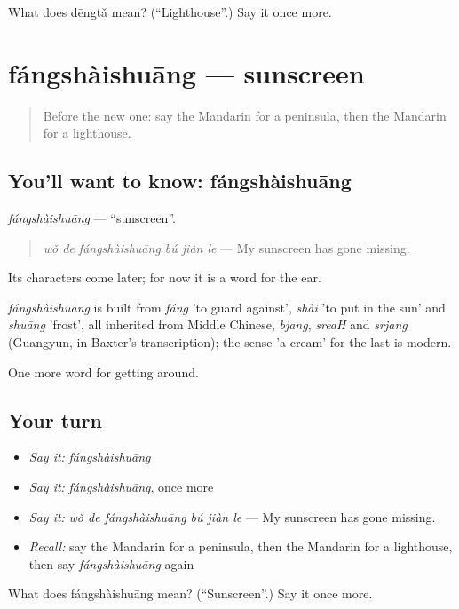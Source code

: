 \begin{tcolorbox}[breakable,colback=teal!4,colframe=teal!35!black,title={Before you move on}]
What does dēngtǎ mean? (\textquotedblleft{}Lighthouse\textquotedblright{}.) Say it once more.
\end{tcolorbox}
\section[fángshàishuāng]{fángshàishuāng — sunscreen}

\label{lesson:ZH-C444-fangshaishuang}



\begin{quote}
Before the new one: say the Mandarin for a peninsula, then the Mandarin for a lighthouse.
\end{quote}

\subsection*{You'll want to know: fángshàishuāng}
\emph{fángshàishuāng} — \textquotedblleft{}sunscreen\textquotedblright{}.

\begin{quote}
\emph{wǒ de fángshàishuāng bú jiàn le} — My sunscreen has gone missing.
\end{quote}

Its characters come later; for now it is a word for the ear.

\begin{cousinweb}
\emph{fángshàishuāng} is built from \emph{fáng} 'to guard against', \emph{shài} 'to put in the sun' and \emph{shuāng} 'frost', all inherited from Middle Chinese, \emph{bjang}, \emph{sreaH} and \emph{srjang} (Guangyun, in Baxter's transcription); the sense 'a cream' for the last is modern.
\end{cousinweb}

\begin{grammarlens}[title={What you've built}]
One more word for getting around.
\end{grammarlens}

\subsection*{Your turn}
\begin{itemize}
\raggedright
  \item \emph{Say it:} \emph{fángshàishuāng}
  \item \emph{Say it:} \emph{fángshàishuāng}, once more
  \item \emph{Say it:} \emph{wǒ de fángshàishuāng bú jiàn le} — My sunscreen has gone missing.
  \item \emph{Recall:} say the Mandarin for a peninsula, then the Mandarin for a lighthouse, then say \emph{fángshàishuāng} again
\end{itemize}

\begin{tcolorbox}[breakable,colback=teal!4,colframe=teal!35!black,title={Before you move on}]
What does fángshàishuāng mean? (\textquotedblleft{}Sunscreen\textquotedblright{}.) Say it once more.
\end{tcolorbox}
